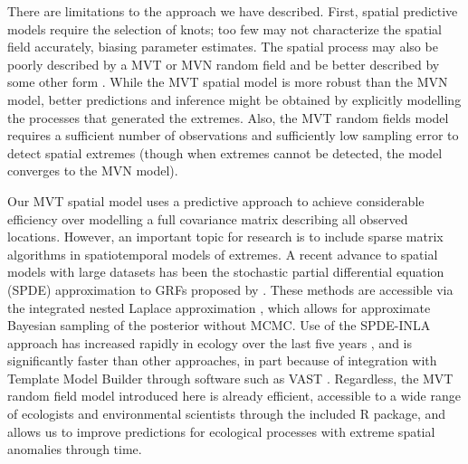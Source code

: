\documentclass[12pt,english]{article}
\begin{document}
\begin{spacing}{1.8}
There are limitations to the approach we have described. First, spatial
predictive models require the selection of knots; too few may not characterize
the spatial field accurately, biasing parameter estimates. The spatial process
may also be poorly described by a MVT or MVN random field and be better
described by some other form \citep[e.g.\ see][]{conn2015}. While the MVT
spatial model is more robust than the MVN model, better predictions and
inference might be obtained by explicitly modelling the processes that generated
the extremes. Also, the MVT random fields model requires a sufficient number of
observations and sufficiently low sampling error to detect spatial extremes
(though when extremes cannot be detected, the model converges to the MVN model).

Our MVT spatial model uses a predictive approach to achieve considerable
efficiency over modelling a full covariance matrix describing all observed
locations. However, an important topic for research is to include sparse matrix
algorithms in spatiotemporal models of extremes. A recent advance to spatial
models with large datasets has been the stochastic partial differential equation
(SPDE) approximation to GRFs proposed by \citet{lindgren2011}. These methods are
accessible via the integrated nested Laplace approximation
\citep[INLA,][]{rue2009}, which allows for approximate Bayesian sampling of the
posterior without MCMC. Use of the SPDE-INLA approach has increased rapidly in
ecology over the last five years \citep[e.g.][]{illian2013, ono2016}, and is
significantly faster than other approaches, in part because of integration with
Template Model Builder through software such as VAST \citep{thorson2017}.
Regardless, the MVT random field model introduced here is already efficient,
accessible to a wide range of ecologists and environmental scientists through
the included R package, and allows us to improve predictions for ecological
processes with extreme spatial anomalies through time.





\end{spacing}
\end{document}
